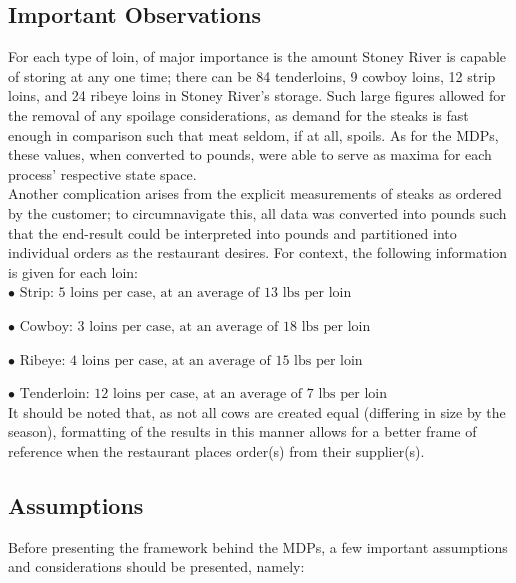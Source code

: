 \documentclass[12pt,a4paper]{article}
\begin{document}
\subsection{Important Observations}

For each type of loin, of major importance is the amount Stoney River is capable of storing at any one time; there can be 84 tenderloins, 9 cowboy loins, 12 strip loins, and 24 ribeye loins in Stoney River's storage. Such large figures allowed for the removal of any spoilage considerations, as demand for the steaks is fast enough in comparison such that meat seldom, if at all, spoils. As for the MDPs, these values, when converted to pounds, were able to serve as maxima for each process' respective state space. 
\\

Another complication arises from the explicit measurements of steaks as ordered by the customer; to circumnavigate this, all data was converted into pounds such that the end-result could be interpreted into pounds and partitioned into individual orders as the restaurant desires. For context, the following information is given for each loin:
\\

$ \bullet \text{ Strip: 5 loins per case, at an average of 13 lbs per loin}  $

$ \bullet \text{ Cowboy: 3 loins per case, at an average of 18 lbs per loin}  $

$ \bullet \text{ Ribeye: 4 loins per case, at an average of 15 lbs per loin}  $

$ \bullet \text{ Tenderloin: 12 loins per case, at an average of 7 lbs per loin}  $
\\

It should be noted that, as not all cows are created equal (differing in size by the season), formatting of the results in this manner allows for a better frame of reference when the restaurant places order(s) from their supplier(s).

\subsection{Assumptions}

Before presenting the framework behind the MDPs, a few important assumptions and considerations should be presented, namely:
\end{document}

